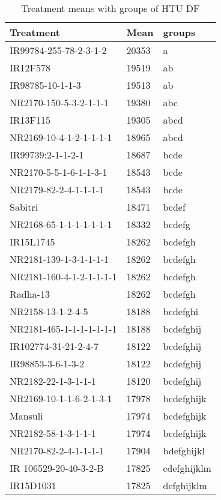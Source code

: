 \documentclass[]{article}
\begin{document}
\begin{longtable}{lll}
\caption{\label{tab:two-fac-groups-tab-agroclimate-normal}Treatment means with groups of HTU DF}\\
\toprule
Treatment & Mean & groups\\
\midrule
\rowcolor{gray!6}  IR99784-255-78-2-3-1-2 & 20353 & a\\
IR12F578 & 19519 & ab\\
\rowcolor{gray!6}  IR98785-10-1-1-3 & 19513 & ab\\
NR2170-150-5-3-2-1-1-1 & 19380 & abc\\
\rowcolor{gray!6}  IR13F115 & 19305 & abcd\\
\addlinespace
NR2169-10-4-1-2-1-1-1-1 & 18965 & abcd\\
\rowcolor{gray!6}  IR99739:2-1-1-2-1 & 18687 & bcde\\
NR2170-5-5-1-6-1-1-3-1 & 18543 & bcde\\
\rowcolor{gray!6}  NR2179-82-2-4-1-1-1-1 & 18543 & bcde\\
Sabitri & 18471 & bcdef\\
\addlinespace
\rowcolor{gray!6}  NR2168-65-1-1-1-1-1-1-1 & 18332 & bcdefg\\
IR15L1745 & 18262 & bcdefgh\\
\rowcolor{gray!6}  NR2181-139-1-3-1-1-1-1 & 18262 & bcdefgh\\
NR2181-160-4-1-2-1-1-1-1 & 18262 & bcdefgh\\
\rowcolor{gray!6}  Radha-13 & 18262 & bcdefgh\\
\addlinespace
NR2158-13-1-2-4-5 & 18188 & bcdefghi\\
\rowcolor{gray!6}  NR2181-465-1-1-1-1-1-1-1 & 18188 & bcdefghij\\
IR102774-31-21-2-4-7 & 18122 & bcdefghij\\
\rowcolor{gray!6}  IR98853-3-6-1-3-2 & 18122 & bcdefghij\\
NR2182-22-1-3-1-1-1 & 18120 & bcdefghij\\
\addlinespace
\rowcolor{gray!6}  NR2169-10-1-1-6-2-1-3-1 & 17978 & bcdefghijk\\
Mansuli & 17974 & bcdefghijk\\
\rowcolor{gray!6}  NR2182-58-1-3-1-1-1 & 17974 & bcdefghijk\\
NR2170-82-2-4-1-1-1-1 & 17904 & bdefghijkl\\
\rowcolor{gray!6}  IR 106529-20-40-3-2-B & 17825 & cdefghijklm\\
\addlinespace
IR15D1031 & 17825 & defghijklm\\

\end{longtable}
\end{document}
